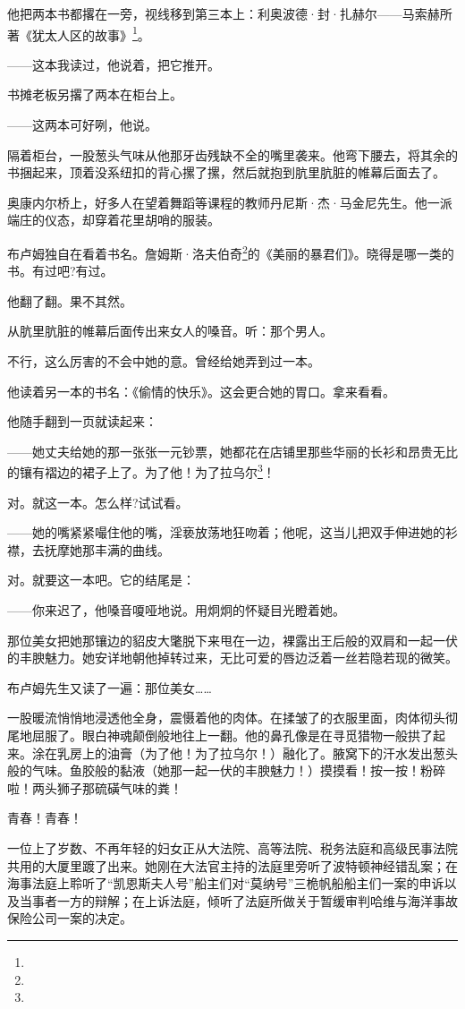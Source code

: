 \par 他把两本书都撂在一旁，视线移到第三本上：利奥波德·封·扎赫尔——马索赫所著《犹太人区的故事》\footnote{}。
\par ——这本我读过，他说着，把它推开。
\par 书摊老板另撂了两本在柜台上。
\par ——这两本可好咧，他说。
\par 隔着柜台，一股葱头气味从他那牙齿残缺不全的嘴里袭来。他弯下腰去，将其余的书捆起来，顶着没系纽扣的背心摞了摞，然后就抱到肮里肮脏的帷幕后面去了。
\par 奥康内尔桥上，好多人在望着舞蹈等课程的教师丹尼斯·杰·马金尼先生。他一派端庄的仪态，却穿着花里胡哨的服装。
\par 布卢姆独自在看着书名。詹姆斯·洛夫伯奇\footnote{}的《美丽的暴君们》。晓得是哪一类的书。有过吧?有过。
\par 他翻了翻。果不其然。
\par 从肮里肮脏的帷幕后面传出来女人的嗓音。听：那个男人。
\par 不行，这么厉害的不会中她的意。曾经给她弄到过一本。
\par 他读着另一本的书名：《偷情的快乐》。这会更合她的胃口。拿来看看。
\par 他随手翻到一页就读起来：
\par ——她丈夫给她的那一张张一元钞票，她都花在店铺里那些华丽的长衫和昂贵无比的镶有褶边的裙子上了。为了他！为了拉乌尔\footnote{}！
\par 对。就这一本。怎么样?试试看。
\par ——她的嘴紧紧嘬住他的嘴，淫亵放荡地狂吻着；他呢，这当儿把双手伸进她的衫襟，去抚摩她那丰满的曲线。
\par 对。就要这一本吧。它的结尾是：
\par ——你来迟了，他嗓音嗄哑地说。用炯炯的怀疑目光瞪着她。
\par 那位美女把她那镶边的貂皮大氅脱下来甩在一边，裸露出王后般的双肩和一起一伏的丰腴魅力。她安详地朝他掉转过来，无比可爱的唇边泛着一丝若隐若现的微笑。
\par 布卢姆先生又读了一遍：那位美女……
\par 一股暖流悄悄地浸透他全身，震慑着他的肉体。在揉皱了的衣服里面，肉体彻头彻尾地屈服了。眼白神魂颠倒般地往上一翻。他的鼻孔像是在寻觅猎物一般拱了起来。涂在乳房上的油膏（为了他！为了拉乌尔！）融化了。腋窝下的汗水发出葱头般的气味。鱼胶般的黏液（她那一起一伏的丰腴魅力！）摸摸看！按一按！粉碎啦！两头狮子那硫磺气味的粪！
\par 青春！青春！
\par 一位上了岁数、不再年轻的妇女正从大法院、高等法院、税务法庭和高级民事法院共用的大厦里踱了出来。她刚在大法官主持的法庭里旁听了波特顿神经错乱案；在海事法庭上聆听了“凯恩斯夫人号”船主们对“莫纳号”三桅帆船船主们一案的申诉以及当事者一方的辩解；在上诉法庭，倾听了法庭所做关于暂缓审判哈维与海洋事故保险公司一案的决定。
